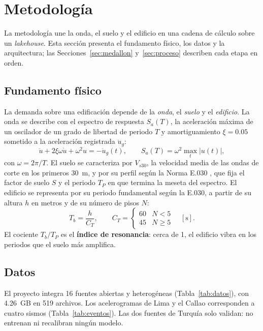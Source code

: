 \documentclass[conference]{IEEEtran}%
\newcommand{\vs}{V_{s30}}
\begin{document}
\section{Metodología}\label{sec:metodologia}
La metodología une la onda, el suelo y el edificio en una cadena de cálculo sobre un \emph{lakehouse}. Esta sección presenta el fundamento físico, los datos y la arquitectura; las Secciones~\ref{sec:medallon} y~\ref{sec:proceso} describen cada etapa en orden.

\subsection{Fundamento físico}
La demanda sobre una edificación depende de la \emph{onda}, el \emph{suelo} y el \emph{edificio}. La onda se describe con el espectro de respuesta $S_a(T)$, la aceleración máxima de un oscilador de un grado de libertad de periodo $T$ y amortiguamiento $\xi=0.05$ sometido a la aceleración registrada $\ddot{u}_g$:
\begin{equation}
\ddot{u}+2\xi\omega\dot{u}+\omega^{2}u=-\ddot{u}_g(t),\qquad S_a(T)=\omega^{2}\max_t|u(t)|,
\label{eq:sdof}
\end{equation}
con $\omega=2\pi/T$. El suelo se caracteriza por $\vs$, la velocidad media de las ondas de corte en los primeros 30~m, y por su perfil según la Norma E.030 \cite{e030}, que fija el factor de suelo $S$ y el periodo $T_P$ en que termina la meseta del espectro. El edificio se representa por su periodo fundamental según la E.030, a partir de su altura $h$ en metros y de su número de pisos $N$:
\begin{equation}
T_b=\frac{h}{C_T},\qquad C_T=\begin{cases}60 & N<5\\45 & N\geq5\end{cases}\quad[\mathrm{s}].
\label{eq:tb}
\end{equation}
El cociente $T_b/T_P$ es el \textbf{índice de resonancia}: cerca de 1, el edificio vibra en los periodos que el suelo más amplifica.

\subsection{Datos}
El proyecto integra 16 fuentes abiertas y heterogéneas (Tabla~\ref{tab:datos}), con 4.26~GB en 519 archivos. Los acelerogramas de Lima y el Callao corresponden a cuatro sismos (Tabla~\ref{tab:eventos}). Las dos fuentes de Turquía solo validan: no entrenan ni recalibran ningún modelo.
\end{document}
